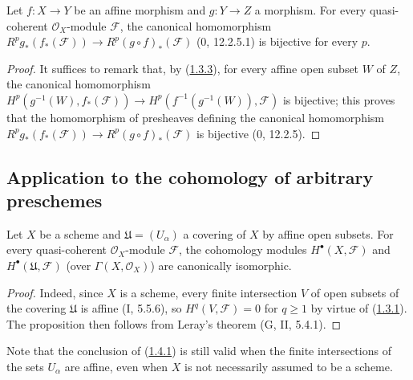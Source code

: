 \begin{corollary}[1.3.4]
\label{III.1.3.4}
Let $f:X\to Y$ be an affine morphism and $g:Y\to Z$ a morphism.
For every quasi-coherent $\mathcal O_X$-module $\mathcal F$,
the canonical homomorphism
$R^pg_*(f_*(\mathcal F))\to R^p(g\circ f)_*(\mathcal F)$ (0, 12.2.5.1)
is bijective for every $p$.
\end{corollary}

\begin{proof}
It suffices to remark that, by
(\hyperref[III.1.3.3]{1.3.3}), for every affine open subset $W$ of $Z$,
the canonical homomorphism
$H^p(g^{-1}(W),f_*(\mathcal F))\to
H^p(f^{-1}(g^{-1}(W)),\mathcal F)$ is bijective; this proves that
the homomorphism of presheaves defining the canonical homomorphism
$R^pg_*(f_*(\mathcal F))\to R^p(g\circ f)_*(\mathcal F)$ is bijective
(0, 12.2.5).
\end{proof}


\subsection{Application to the cohomology of arbitrary preschemes}
\label{subsection:III.1.4}

\begin{proposition}[1.4.1]
\label{III.1.4.1}
Let $X$ be a scheme and $\mathfrak U=(U_\alpha)$ a covering of $X$ by
affine open subsets. For every quasi-coherent $\mathcal O_X$-module
$\mathcal F$, the cohomology modules $H^\bullet(X,\mathcal F)$ and
$H^\bullet(\mathfrak U,\mathcal F)$ (over $\Gamma(X,\mathcal O_X)$) are
canonically isomorphic.
\end{proposition}

\begin{proof}
Indeed, since $X$ is a scheme, every finite intersection $V$ of open subsets
of the covering $\mathfrak U$ is affine (I, 5.5.6), so
$H^q(V,\mathcal F)=0$ for $q\geq1$ by virtue of
(\hyperref[III.1.3.1]{1.3.1}). The proposition then follows from Leray's
theorem (G, II, 5.4.1).
\end{proof}

\begin{remark}[1.4.2]
\label{III.1.4.2}
Note that the conclusion of (\hyperref[III.1.4.1]{1.4.1}) is still
valid when the finite intersections of the sets $U_\alpha$ are
affine, even when $X$ is not necessarily assumed to be a
scheme.
\end{remark}

